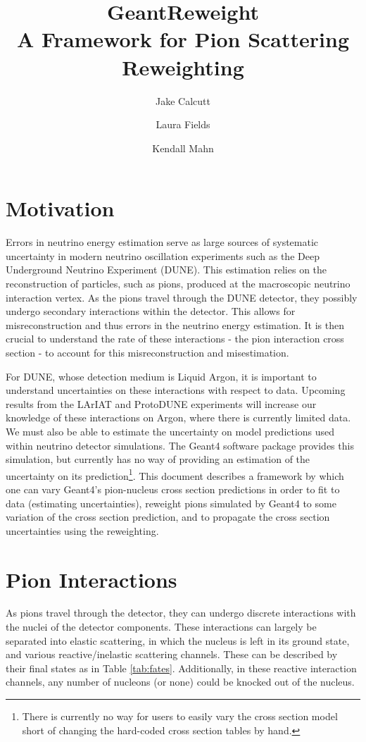 \documentclass[12pt]{article}
\title{GeantReweight \\ 
   \large A Framework for Pion Scattering Reweighting}
\date{}
\begin{document}
\author[1]{Jake Calcutt}
\author[2]{Laura Fields}
\author[1]{Kendall Mahn}

\maketitle
\thispagestyle{fancy}

\section{Motivation}
Errors in neutrino energy estimation serve as large sources of systematic uncertainty in modern neutrino oscillation experiments such as the Deep Underground Neutrino Experiment (DUNE). This estimation relies on the reconstruction of particles, such as pions, produced at the macroscopic neutrino interaction vertex. As the pions travel through the DUNE detector, they possibly undergo secondary interactions within the detector. This allows for misreconstruction and thus errors in the neutrino energy estimation.  It is then crucial to understand the rate of these interactions - the pion interaction cross section - to account for this misreconstruction and misestimation. 

For DUNE, whose detection medium is Liquid Argon, it is important to understand uncertainties on these interactions with respect to data. Upcoming results from the LArIAT and ProtoDUNE experiments will increase our knowledge of these interactions on Argon, where there is currently limited data. We must also be able to estimate the uncertainty on model predictions used within neutrino detector simulations. The Geant4 software package provides this simulation, but currently has no way of providing an estimation of the uncertainty on its prediction\footnote{There is currently no way for users to easily vary the cross section model short of changing the hard-coded cross section tables by hand.}. This document describes a framework by which one can vary Geant4's pion-nucleus cross section predictions in order to fit to data (estimating uncertainties), reweight pions simulated by Geant4 to some variation of the cross section prediction, and to propagate the cross section uncertainties using the reweighting. 

\section{Pion Interactions}
As pions travel through the detector, they can undergo discrete interactions with the nuclei of the detector components. These interactions can largely be separated into elastic scattering, in which the nucleus is left in its ground state, and various reactive/inelastic scattering channels. These can be described by their final states as in Table \ref{tab:fates}. Additionally, in these reactive interaction channels, any number of nucleons (or none) could be knocked out of the nucleus. 
\end{document}
